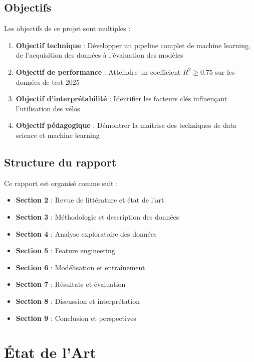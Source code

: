\documentclass[12pt,a4paper]{article}
\begin{document}
\subsection{Objectifs}

Les objectifs de ce projet sont multiples :

\begin{enumerate}
    \item \textbf{Objectif technique} : Développer un pipeline complet de machine learning, de l'acquisition des données à l'évaluation des modèles
    \item \textbf{Objectif de performance} : Atteindre un coefficient $R^2 \geq 0.75$ sur les données de test 2025
    \item \textbf{Objectif d'interprétabilité} : Identifier les facteurs clés influençant l'utilisation des vélos
    \item \textbf{Objectif pédagogique} : Démontrer la maîtrise des techniques de data science et machine learning
\end{enumerate}

\subsection{Structure du rapport}

Ce rapport est organisé comme suit :
\begin{itemize}
    \item \textbf{Section 2} : Revue de littérature et état de l'art
    \item \textbf{Section 3} : Méthodologie et description des données
    \item \textbf{Section 4} : Analyse exploratoire des données
    \item \textbf{Section 5} : Feature engineering
    \item \textbf{Section 6} : Modélisation et entraînement
    \item \textbf{Section 7} : Résultats et évaluation
    \item \textbf{Section 8} : Discussion et interprétation
    \item \textbf{Section 9} : Conclusion et perspectives
\end{itemize}

\section{État de l'Art}
\end{document}

